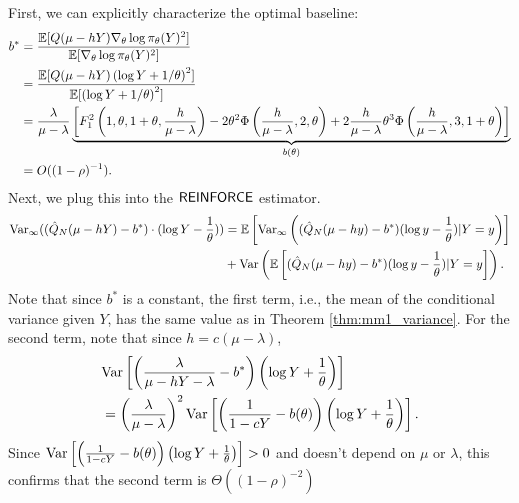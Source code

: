 First, we can explicitly characterize the optimal baseline:
\begin{align*}
b^{*} &= \frac{\mathbb{E}[Q(\mu -hY) \nabla_{\theta} \log \pi_{\theta}(Y)^{2}]}{\mathbb{E}[\nabla_{\theta}\log \pi_{\theta}(Y)^{2}]} \\
 &= \frac{\mathbb{E}[Q(\mu -hY) \left( \log Y + 1/\theta \right)^{2}]}{\mathbb{E}[\left( \log Y + 1/\theta \right)^{2}]} \\
&= \frac{\lambda}{\mu - \lambda}\underbrace{\left[F^{2}_{1}\left(1,\theta,1+\theta,\frac{h}{\mu-\lambda}\right) -2\theta^{2}\Phi\left(\frac{h}{\mu-\lambda},2,\theta\right) + 2\frac{h}{\mu-\lambda}\theta^{3}\Phi\left(\frac{h}{\mu-\lambda},3,1+\theta\right)\right]}_{b(\theta)}  \\
& = O((1-\rho)^{-1}).
\end{align*}
Next, we plug this into the $\mathsf{REINFORCE}$ estimator. 
\begin{align*}
    {\rm Var}_{\infty}((\hat{Q}_{N}(\mu-hY)-b^*)\cdot(\log Y-\frac{1}{\theta}))&=\mathbb{E}\left[{\rm Var}_{\infty}\left((\hat{Q}_{N}(\mu-hy)-b^*)(\log y-\frac{1}
{\theta})|Y=y\right)\right]\\
&+{\rm Var}\left(\mathbb{E}\left[(\hat{Q}_{N}(\mu-hy) - b^{*})(\log y-\frac{1}{\theta})|Y=y\right]\right).
\end{align*}
Note that since $b^{*}$ is a constant, the first term, i.e., the mean of the conditional variance given $Y$, has the same value as in Theorem \ref{thm:mm1_variance}. For the second term, note that since $h = c(\mu - \lambda)$,
\begin{align*}
& {\rm Var} \left[ \left(\frac{\lambda}{\mu - hY - \lambda}  - b^{*}\right)
\left( \log Y + \frac{1}{\theta} \right) \right]  \\
&= \left(\frac{\lambda}{\mu - \lambda}\right)^{2} {\rm Var} \left[ \left(\frac{1}{1- cY}  - b(\theta)\right)
\left( \log Y + \frac{1}{\theta} \right) \right].
\end{align*}
Since ${\rm Var} \left[ \left(\frac{1}{1- cY}  - b(\theta)\right)
\left( \log Y + \frac{1}{\theta} \right) \right] > 0$ and doesn't depend on $\mu$ or $\lambda$, this confirms that the second term is $\Theta((1-\rho)^{-2})$

